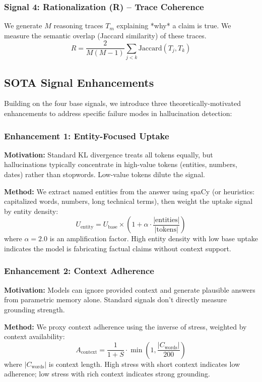\documentclass[11pt,letterpaper]{article}
\begin{document}
\subsubsection{Signal 4: Rationalization (R) -- Trace Coherence}
We generate $M$ reasoning traces $T_m$ explaining *why* a claim is true. We measure the semantic overlap (Jaccard similarity) of these traces.
\begin{equation}
    R = \frac{2}{M(M-1)} \sum_{j<k} \text{Jaccard}(T_j, T_k)
\end{equation}

\subsection{SOTA Signal Enhancements}

Building on the four base signals, we introduce three theoretically-motivated enhancements to address specific failure modes in hallucination detection:

\subsubsection{Enhancement 1: Entity-Focused Uptake}
\textbf{Motivation:} Standard KL divergence treats all tokens equally, but hallucinations typically concentrate in high-value tokens (entities, numbers, dates) rather than stopwords. Low-value tokens dilute the signal.

\textbf{Method:} We extract named entities from the answer using spaCy (or heuristics: capitalized words, numbers, long technical terms), then weight the uptake signal by entity density:
\begin{equation}
    U_{\text{entity}} = U_{\text{base}} \times \left(1 + \alpha \cdot \frac{|\text{entities}|}{|\text{tokens}|}\right)
\end{equation}
where $\alpha=2.0$ is an amplification factor. High entity density with low base uptake indicates the model is fabricating factual claims without context support.

\subsubsection{Enhancement 2: Context Adherence}
\textbf{Motivation:} Models can ignore provided context and generate plausible answers from parametric memory alone. Standard signals don't directly measure grounding strength.

\textbf{Method:} We proxy context adherence using the inverse of stress, weighted by context availability:
\begin{equation}
    A_{\text{context}} = \frac{1}{1 + S} \cdot \min\left(1, \frac{|C_{\text{words}}|}{200}\right)
\end{equation}
where $|C_{\text{words}}|$ is context length. High stress with short context indicates low adherence; low stress with rich context indicates strong grounding.
\end{document}
